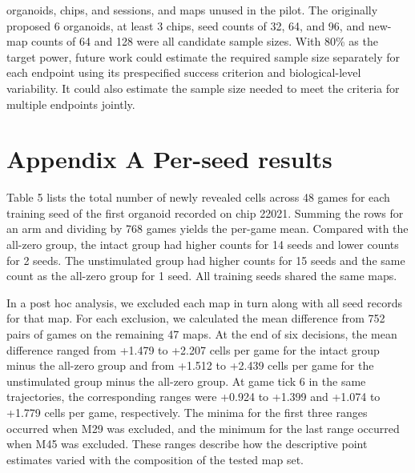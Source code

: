 \documentclass{article}
\begin{document}
organoids, chips, and sessions, and maps unused in the pilot. The originally proposed 6 organoids, at least 3 chips, seed counts of 32, 64, and 96, and new-map counts of 64 and 128 were all candidate sample sizes. With 80\% as the target power, future work could estimate the required sample size separately for each endpoint using its prespecified success criterion and biological-level variability. It could also estimate the sample size needed to meet the criteria for multiple endpoints jointly.


\section*{Appendix A Per-seed results}


Table 5 lists the total number of newly revealed cells across 48 games for each training seed of the first organoid recorded on chip 22021. Summing the rows for an arm and dividing by 768 games yields the per-game mean. Compared with the all-zero group, the intact group had higher counts for 14 seeds and lower counts for 2 seeds. The unstimulated group had higher counts for 15 seeds and the same count as the all-zero group for 1 seed. All training seeds shared the same maps.


In a post hoc analysis, we excluded each map in turn along with all seed records for that map. For each exclusion, we calculated the mean difference from 752 pairs of games on the remaining 47 maps. At the end of six decisions, the mean difference ranged from +1.479 to +2.207 cells per game for the intact group minus the all-zero group and from +1.512 to +2.439 cells per game for the unstimulated group minus the all-zero group. At game tick 6 in the same trajectories, the corresponding ranges were +0.924 to +1.399 and +1.074 to +1.779 cells per game, respectively. The minima for the first three ranges occurred when M29 was excluded, and the minimum for the last range occurred when M45 was excluded. These ranges describe how the descriptive point estimates varied with the composition of the tested map set.
\end{document}
